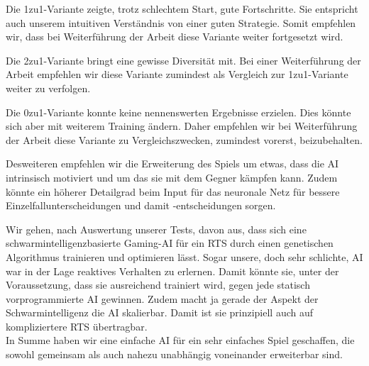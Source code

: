 \documentclass[
	12pt,
	a4paper,
	BCOR10mm,
	DIV14,
	headsepline,
	usegeometry,
]{scrreprt}
\begin{document}
Die 1zu1-Variante zeigte, trotz schlechtem Start, gute Fortschritte.
Sie entspricht auch unserem intuitiven Verständnis von einer guten Strategie.
Somit empfehlen wir, dass bei Weiterführung der Arbeit diese Variante weiter fortgesetzt wird.

Die 2zu1-Variante bringt eine gewisse Diversität mit.
Bei einer Weiterführung der Arbeit empfehlen wir diese Variante zumindest als Vergleich zur 1zu1-Variante weiter zu verfolgen.

Die 0zu1-Variante konnte keine nennenswerten Ergebnisse erzielen.
Dies könnte sich aber mit weiterem Training ändern.
Daher empfehlen wir bei Weiterführung der Arbeit diese Variante zu Vergleichszwecken, zumindest vorerst, beizubehalten.

Desweiteren empfehlen wir die Erweiterung des Spiels um etwas, dass die AI intrinsisch motiviert und um das sie mit dem Gegner kämpfen kann.
Zudem könnte ein höherer Detailgrad beim Input für das neuronale Netz für bessere Einzelfallunterscheidungen und damit -entscheidungen sorgen.

Wir gehen, nach Auswertung unserer Tests, davon aus, dass sich eine schwarmintelligenzbasierte Gaming-AI für ein RTS durch einen genetischen Algorithmus trainieren und optimieren lässt.
Sogar unsere, doch sehr schlichte, AI war in der Lage reaktives Verhalten zu erlernen.
Damit könnte sie, unter der Voraussetzung, dass sie ausreichend trainiert wird, gegen jede statisch vorprogrammierte AI gewinnen.
Zudem macht ja gerade der Aspekt der Schwarmintelligenz die AI skalierbar.
Damit ist sie prinzipiell auch auf kompliziertere RTS übertragbar.\\
In Summe haben wir eine einfache AI für ein sehr einfaches Spiel geschaffen, die sowohl gemeinsam als auch nahezu unabhängig voneinander erweiterbar sind.
\end{document}
